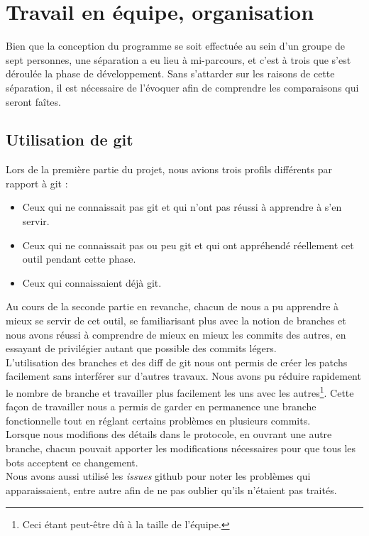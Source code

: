 \documentclass[a4paper,12pt]{article}
\begin{document}
\section{Travail en équipe, organisation}

Bien que la conception du programme se soit effectuée au sein d'un groupe
de sept personnes, une séparation a eu lieu à mi-parcours, et c'est à trois que
s'est déroulée la phase de développement. Sans s'attarder sur les raisons de
cette séparation, il est nécessaire de l'évoquer afin de comprendre les
comparaisons qui seront faîtes.

\subsection{Utilisation de git}
Lors de la première partie du projet, nous avions trois profils différents par
rapport à git :
\begin{itemize}
\item Ceux qui ne connaissait pas git et qui n'ont pas réussi à apprendre à s'en
  servir.
\item Ceux qui ne connaissait pas ou peu git et qui ont appréhendé réellement
  cet outil pendant cette phase.
\item Ceux qui connaissaient déjà git.
\end{itemize}
Au cours de la seconde partie en revanche, chacun de nous a pu apprendre à mieux
se servir de cet outil, se familiarisant plus avec la notion de branches et nous
avons réussi à comprendre de mieux en mieux les commits des autres, en essayant
de privilégier autant que possible des commits légers.
\\
L'utilisation des branches et des diff de git nous ont permis de créer les
patchs facilement sans interférer sur d'autres travaux. Nous avons pu réduire
rapidement le nombre de branche et travailler plus facilement les uns avec les
autres\footnote{Ceci étant peut-être dû à la taille de l'équipe.}. Cette façon
de travailler nous a permis de garder en permanence une branche fonctionnelle
tout en réglant certains problèmes en plusieurs commits.
\\
Lorsque nous modifions des détails dans le protocole, en ouvrant une autre
branche, chacun pouvait apporter les modifications nécessaires pour que tous les
bots acceptent ce changement.
\\
Nous avons aussi utilisé les {\em issues} github pour noter les problèmes qui
apparaissaient, entre autre afin de ne pas oublier qu'ils n'étaient pas traités.
\end{document}
